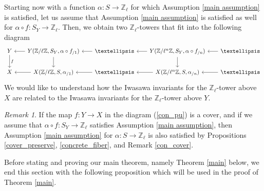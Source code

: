 \documentclass[11pt]{amsart}
\numberwithin{equation}{section}
\theoremstyle{remark}
\newtheorem{remark}[theorem]{Remark}
\begin{document}
Starting now with a function $\alpha:S \rightarrow \mathbb{Z}_{\ell}$ for which Assumption \ref{main assumption} is satisfied, let us assume that Assumption \ref{main assumption} is satisfied as well for $\alpha \circ f:S_{Y}\rightarrow \mathbb{Z}_{\ell} $.  Then, we obtain two $\mathbb{Z}_{\ell}$-towers that fit into the following diagram
\begin{equation} \label{con_pu}
\begin{tikzcd}[sep=1.8em, font=\small]
Y \arrow["f",d] & \arrow[l] \arrow[d] Y(\mathbb{Z}/\ell\mathbb{Z},S_{Y},\alpha \circ f_{/1})& \arrow[l] \ldots&\arrow[l]\arrow[d] Y(\mathbb{Z}/\ell^{n}\mathbb{Z},S_{Y},\alpha \circ f_{/n}) & \arrow[l] \ldots \\
X & \arrow[l] X(\mathbb{Z}/\ell\mathbb{Z},S,\alpha_{/1})  &\arrow[l] \ldots &\arrow[l]X(\mathbb{Z}/\ell^{n}\mathbb{Z},S,\alpha_{/n}) & \arrow[l] \ldots
\end{tikzcd}
\end{equation}
We would like to understand how the Iwasawa invariants for the $\mathbb{Z}_{\ell}$-tower above $X$ are related to the Iwasawa invariants for the $\mathbb{Z}_{\ell}$-tower above $Y$.  
\begin{remark} \label{conn_propagated}
If the map $f:Y \rightarrow X$ in the diagram (\ref{con_pu}) is a cover, and if we assume that $\alpha \circ f:S_{Y}\rightarrow \mathbb{Z}_{\ell}$ satisfies Assumption \ref{main assumption}, then Assumption \ref{main assumption} for $\alpha:S \rightarrow \mathbb{Z}_{\ell}$ is also satisfied by Propositions \ref{cover_preserve}, \ref{concrete_fiber}, and Remark \ref{con_cover}.
\end{remark}

Before stating and proving our main theorem, namely Theorem \ref{main} below, we end this section with the following proposition which will be used in the proof of Theorem \ref{main}.
\end{document}

